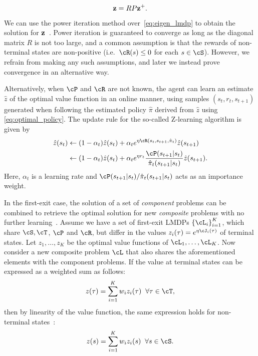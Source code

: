 \begin{equation}
  {\bf z} = R P {\bf z^+}.
  \label{eq:eigen_lmdp}
\end{equation}
We can use the power iteration method over~\eqref{eq:eigen_lmdp} to obtain the solution for ${\bf z}$~\citep{Todorov2006}. Power iteration is guaranteed to converge as long as the diagonal matrix $R$ is not too large, and a common assumption is that the rewards of non-terminal states are non-positive (i.e.~$\cR(s)\leq 0$ for each $s\in\cS$). However, we refrain from making any such assumptions, and later we instead prove convergence in an alternative way.

Alternatively, when $\cP$ and $\cR$ are not known, the agent can learn an estimate $\hat z$ of the optimal value function in an online manner, using samples $(s_t, r_t, s_{t+1})$ generated when following the estimated policy $\hat\pi$ derived from $\hat z$ using \eqref{eq:optimal_policy}. The update rule for the so-called Z-learning algorithm is given by
\begin{align}
  \hat z(s_{t})&\gets(1-\alpha_t)  \hat z(s_{t}) + \alpha_t e^{\eta\cR(s_t, s_{t+1}, \hat\pi_t)} \hat z(s_{t+1}) \nonumber\\
  &\gets(1-\alpha_t)  \hat z(s_{t}) + \alpha_t e^{\eta r_t} \frac {\cP(s_{t+1}|s_t)} {\hat\pi_t(s_{t+1}|s_t)} \hat z(s_{t+1}).
  \label{eq:z_learning}
\end{align}
Here, $\alpha_t$ is a learning rate and $\cP(s_{t+1}|s_t)/\hat\pi_t(s_{t+1}|s_t)$ acts as an importance weight.


In the first-exit case, the solution of a set of \textit{component} problems can be combined to retrieve the optimal solution for new \textit{composite} problems with no further learning~\citep{Todorov2009a}. Assume we have a set of first-exit LMDPs ${\{\cL_i\}}_{i=1}^K$, which share $\cS, \cT$, $\cP$ and $\cR$, but differ in the values $z_i(\tau) = e^{\eta\cJ_i(\tau)}$ of terminal states. Let $z_1,\ldots,z_K$ be the optimal value functions of $\cL_1,\ldots,\cL_K$. Now consider a new composite problem $\cL$ that also shares the aforementioned elements with the component problems. If the value at terminal states can be expressed as a weighted sum as follows:
\[z(\tau) = \sum_{i=1}^K  w_i z_i(\tau) \;\;\forall\tau\in\cT, \] then by linearity of the value function, the same expression holds for non-terminal states~\cite{Todorov2009a}:
\[z(s) = \sum_{i=1}^K w_i z_i(s) \;\;\forall s\in\cS.\]

